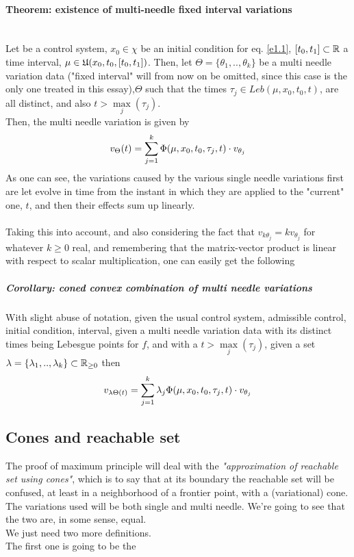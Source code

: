 \paragraph[4.12]{Theorem: existence of multi-needle fixed interval variations}\mbox{}\\
Let \controlSystem be a control system, $x_0\in\chi$ be an initial condition for eq. \ref{e1.1}, $[t_0,t_1]\subset\mathbb{R}$ a time interval, $\mu\in\mathfrak{U}(x_0,t_0,[t_0,t_1])$. Then, let $\Theta=\{\theta_1,..,\theta_k\}$ be a multi needle variation data ("fixed interval" will from now on be omitted, since this case is the only one treated in this essay),$\Theta$ such that the times $\tau_j\in Leb(\mu,x_0,t_0,t)$, are all distinct, and also $t>\underset{j}{\max}(\tau_j)$.\\
Then, the multi needle variation is given by
\[v_\Theta(t)=\sum_{j=1}^{k}\Phi(\mu,x_0,t_0,\tau_j,t)\cdot v_{\theta_j} \]
As one can see, the variations caused by the various single needle variations first are let evolve in time from the instant in which they are applied to the "current" one, $t$, and then their effects sum up linearly.\\\\
Taking this into account, and also considering the fact that $v_{k\theta_j}=kv_{\theta_j}$ for whatever $k\geq0$ real, and remembering that the matrix-vector product is linear with respect to scalar multiplication, one can easily get the following
\subparagraph[4.13]{Corollary: coned convex combination of multi needle variations} With slight abuse of notation, given the usual control system, admissible control, initial condition, interval, given a multi needle variation data with its distinct times being Lebesgue points for $f$, and with a $t>\underset{j}{\max}(\tau_j)$, given a set $\lambda=\{\lambda_1,..,\lambda_k\}\subset\mathbb{R}_{\geq0}$ then
\[ v_{\lambda\Theta(t)}=\sum_{j=1}^{k}\lambda_j\Phi(\mu,x_0,t_0,\tau_j,t)\cdot v_{\theta_j} \]


\subsection{Cones and reachable set}
The proof of maximum principle will deal with the \textit{"approximation of reachable set using cones"}, which is to say that at its boundary the reachable set will be confused, at least in a neighborhood of a frontier point,  with a (variational) cone. The variations used will be both single and multi needle. We're going to see that the two are, in some sense, equal.\\ We just need two more definitions.\\The first one is going to be the 

